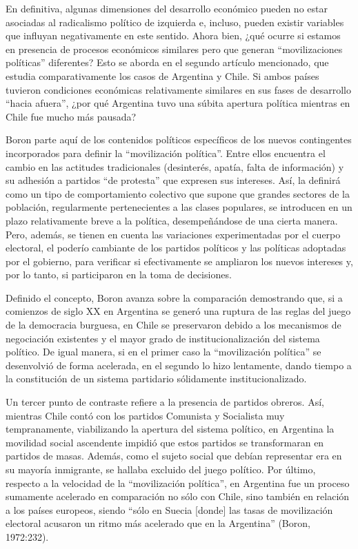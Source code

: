En definitiva, algunas dimensiones del desarrollo económico pueden no estar asociadas al radicalismo político de izquierda e, incluso, pueden existir variables que influyan negativamente en este sentido. Ahora bien, ¿qué ocurre si estamos en presencia de procesos económicos similares pero que generan ``movilizaciones políticas'' diferentes? Esto se aborda en el segundo artículo mencionado, que estudia comparativamente los casos de Argentina y Chile. Si ambos países tuvieron condiciones económicas relativamente similares en sus fases de desarrollo ``hacia afuera'', ¿por qué Argentina tuvo una súbita apertura política mientras en Chile fue mucho más pausada?

Boron parte aquí de los contenidos políticos específicos de los nuevos contingentes incorporados para definir la ``movilización política''. Entre ellos encuentra el cambio en las actitudes tradicionales (desinterés, apatía, falta de información) y su adhesión a partidos ``de protesta'' que expresen sus intereses. Así, la definirá como un tipo de comportamiento colectivo que supone que grandes sectores de la población, regularmente pertenecientes a las clases populares, se introducen en un plazo relativamente breve a la política, desempeñándose de una cierta manera. Pero, además, se tienen en cuenta las variaciones experimentadas por el cuerpo electoral, el poderío cambiante de los partidos políticos y las políticas adoptadas por el gobierno, para verificar si efectivamente se ampliaron los nuevos intereses y, por lo tanto, si participaron en la toma de decisiones.

Definido el concepto, Boron avanza sobre la comparación demostrando que, si a comienzos de siglo XX en Argentina se generó una ruptura de las reglas del juego de la democracia burguesa, en Chile se preservaron debido a los mecanismos de negociación existentes y el mayor grado de institucionalización del sistema político. De igual manera, si en el primer caso la ``movilización política'' se desenvolvió de forma acelerada, en el segundo lo hizo lentamente, dando tiempo a la constitución de un sistema partidario sólidamente institucionalizado.

Un tercer punto de contraste refiere a la presencia de partidos obreros. Así, mientras Chile contó con los partidos Comunista y Socialista muy tempranamente, viabilizando la apertura del sistema político, en Argentina la movilidad social ascendente impidió que estos partidos se transformaran en partidos de masas. Además, como el sujeto social que debían representar era en su mayoría inmigrante, se hallaba excluido del juego político. Por último, respecto a la velocidad de la ``movilización política'', en Argentina fue un proceso sumamente acelerado en comparación no sólo con Chile, sino también en relación a los países europeos, siendo ``sólo en Suecia {[}donde{]} las tasas de movilización electoral acusaron un ritmo más acelerado que en la Argentina'' (Boron, 1972:232).


